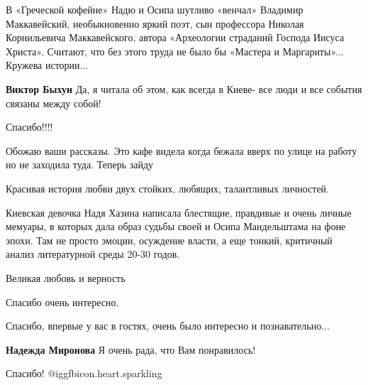 \begin{itemize}

В «Греческой кофейне» Надю и Осипа шутливо «венчал» Владимир Маккавейский,
необыкновенно яркий поэт, сын профессора Николая Корнильевича Маккавейского,
автора «Археологии страданий Господа Иисуса Христа». Считают, что без этого
труда не было бы «Мастера и Маргариты»... Кружева истории...

\textbf{Виктор Быхун} Да, я читала об этом, как всегда в Киеве- все люди и все события связаны между собой!

Спасибо!!!!

Обожаю ваши рассказы. Это кафе видела когда бежала вверх по улице на работу но
не заходила туда. Теперь зайду

Красивая история любви двух стойких, любящих, талантливых личностей.


Киевская девочка Надя Хазина написала блестящие, правдивые и очень личные
мемуары, в которых дала образ судьбы своей и Осипа Мандельштама на фоне эпохи.
Там не просто эмоции, осуждение власти, а еще тонкий, критичный анализ
литературной среды 20-30 годов.

Великая любовь и верность

Спасибо очень интересно.

Спасибо, впервые у вас в гостях, очень было интересно и познавательно...

\textbf{Надежда Миронова} Я очень рада, что Вам понравилось!

Спасибо! @igg{fbicon.heart.sparkling} 

\end{itemize} %
